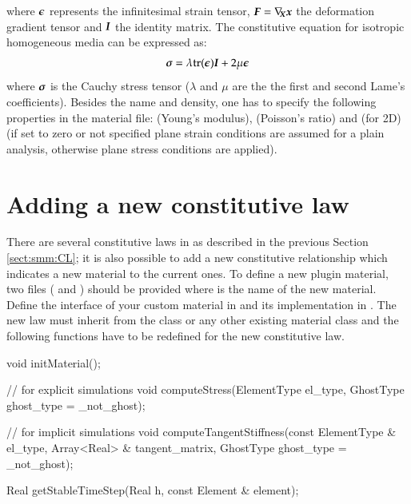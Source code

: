 where $\boldsymbol{\epsilon}$ represents the infinitesimal strain tensor, $\boldsymbol{F} =
\nabla_{\!\!\boldsymbol{X}}\boldsymbol{x}$ the deformation gradient tensor and $\boldsymbol{I}$ the
identity matrix. The constitutive equation for isotropic homogeneous media can
be expressed as:
\begin{equation}\label{eqn:smm:material:constitutive_elastic}
  \boldsymbol{\sigma } =\lambda\mathrm{tr}(\boldsymbol{\epsilon})\boldsymbol{I}+2 \mu \boldsymbol{\epsilon}
\end{equation}
where $\boldsymbol{\sigma}$ is the Cauchy stress tensor ($\lambda$ and $\mu$ are the
the first and second Lame's coefficients). Besides the name and density, one has
to specify the following properties in the material file:  (Young's
modulus),  (Poisson's ratio) and (for 2D)  (if set
to zero or not specified plane strain conditions are assumed for a plain
analysis, otherwise plane stress conditions are applied).




\section{Adding a new constitutive law}

There are several constitutive laws in \akantu as described in the
previous Section \ref{sect:smm:CL}; it is also possible to add a new
constitutive relationship which indicates a new material to the current ones. To
define a new plugin material, two files ( and
) should be provided where  is the name of the
new material. Define the interface of your custom material  in  and its implementation in .  The new law must inherit from the
 class or any other existing material class and the following
functions have to be redefined for the new constitutive law.

\begin{cpp}
  void initMaterial();

  // for explicit simulations
  void computeStress(ElementType el_type, GhostType ghost_type = _not_ghost);

  // for implicit simulations
  void computeTangentStiffness(const ElementType & el_type,
			       Array<Real> & tangent_matrix,
			       GhostType ghost_type = _not_ghost);

  Real getStableTimeStep(Real h, const Element & element);
\end{cpp}

